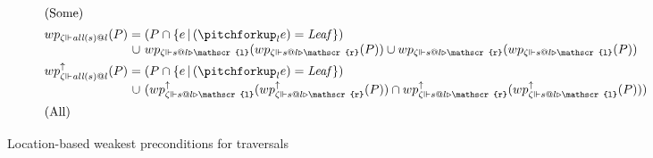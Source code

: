 \begin{figure}
\begin{align*}
    \\\intertext{\centering(Some)}
    &\begin{array}{@{}l@{\;}c@{\;}l}wp_{\zeta \Vdash \mathit{all}(s) @ l}(P)
    &=& (P \cap \{e \barr (\pitchforkup_l e) = \mathit{Leaf}\})
    \\&\cup& wp_{\zeta \Vdash s@l\triangleright \mathscr{l}}(wp_{\zeta \Vdash s@l \triangleright \mathscr{r}}(P)) \cup wp_{\zeta \Vdash s@l\triangleright \mathscr{r}} (wp_{\zeta \Vdash s@l \triangleright \mathscr{l}}(P))\end{array}
    \\
    &\begin{array}{@{}l@{\;}c@{\;}l}wp_{\zeta \Vdash \mathit{all}(s) @ l} ^ \uparrow(P) &=& (P \cap \{e \barr (\pitchforkup_l e) = \mathit{Leaf}\})
    \\&\cup& (wp_{\zeta \Vdash s@l\triangleright \mathscr{l}} ^\uparrow (wp_{\zeta \Vdash s@l \triangleright \mathscr{r}} ^ \uparrow(P)) \cap wp_{\zeta \Vdash s@l\triangleright \mathscr{r}} ^\uparrow (wp_{\zeta \Vdash s@l \triangleright \mathscr{l}} ^ \uparrow(P)))
    \end{array}
    \\\intertext{\centering(All)}
\end{align*}
    \vspace{-3em}
    \caption{Location-based weakest preconditions for traversals}
    \label{wp:traversals}
\end{figure}

